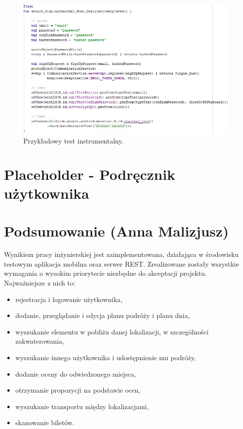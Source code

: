 \documentclass[10pt,twoside,a4paper]{report}
\begin{document}
\begin{figure}[h]
\centering
\includegraphics[width=\linewidth]{instrumentationTest}
\caption{Przykładowy test instrumentalny.}
\label{fig:instrumentationTest}
\end{figure}


\chapter{Placeholder - Podręcznik użytkownika}

\chapter{Podsumowanie (Anna Malizjusz)}

\par Wynikiem pracy inżynierskiej jest zaimplementowana, działająca w środowisku testowym aplikacja mobilna oraz serwer REST. Zrealizowane zostały wszystkie wymagania o wysokim priorytecie niezbędne do akceptacji projektu. Najważniejsze z nich to:
\begin{itemize}
\item rejestracja i logowanie użytkownika,
\item dodanie, przeglądanie i edycja planu podróży i planu dnia,
\item wyszukanie elementu w pobliżu danej lokalizacji, w szczególności zakwaterowania,
\item wyszukanie innego użytkownika i udostępnienie mu podróży,
\item dodanie oceny do odwiedzonego miejsca,
\item otrzymanie propozycji na podstawie ocen,
\item wyszukanie transportu między lokalizacjami,
\item skanowanie biletów.
\end{itemize}
\end{document}
